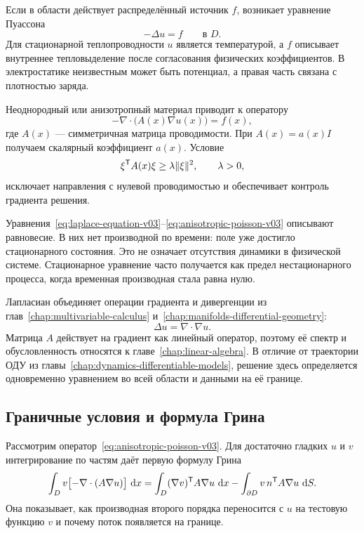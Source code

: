 Если в области действует распределённый источник $f$, возникает уравнение Пуассона
\begin{equation}
\label{eq:poisson-equation-v03}
-\Delta u=f
\qquad
\text{в }D.
\end{equation}
Для стационарной теплопроводности $u$ является температурой, а $f$ описывает внутреннее тепловыделение после согласования физических коэффициентов. В электростатике неизвестным может быть потенциал, а правая часть связана с плотностью заряда.

Неоднородный или анизотропный материал приводит к оператору
\begin{equation}
\label{eq:anisotropic-poisson-v03}
-\nabla\cdot\bigl(A(x)\nabla u(x)\bigr)=f(x),
\end{equation}
где $A(x)$ --- симметричная матрица проводимости. При $A(x)=a(x)I$ получаем скалярный коэффициент $a(x)$. Условие
\begin{equation}
\label{eq:anisotropic-ellipticity-v03}
\xi^{\mathsf{T}}A(x)\xi
\geq
\lambda\lVert\xi\rVert^{2},
\qquad
\lambda>0,
\end{equation}
исключает направления с нулевой проводимостью и обеспечивает контроль градиента решения.

Уравнения~\eqref{eq:laplace-equation-v03}--\eqref{eq:anisotropic-poisson-v03} описывают равновесие. В них нет производной по времени: поле уже достигло стационарного состояния. Это не означает отсутствия динамики в физической системе. Стационарное уравнение часто получается как предел нестационарного процесса, когда временная производная стала равна нулю.

\begin{connection}
Лапласиан объединяет операции градиента и дивергенции из глав~\ref{chap:multivariable-calculus} и~\ref{chap:manifolds-differential-geometry}:
\[
\Delta u=\nabla\cdot\nabla u.
\]
Матрица $A$ действует на градиент как линейный оператор, поэтому её спектр и обусловленность относятся к главе~\ref{chap:linear-algebra}. В отличие от траектории ОДУ из главы~\ref{chap:dynamics-differentiable-models}, решение здесь определяется одновременно уравнением во всей области и данными на её границе.
\end{connection}

\subsection{Граничные условия и формула Грина}

Рассмотрим оператор~\eqref{eq:anisotropic-poisson-v03}. Для достаточно гладких $u$ и $v$ интегрирование по частям даёт первую формулу Грина
\begin{equation}
\label{eq:green-identity-anisotropic-v03}
\int_D
v\bigl[-\nabla\cdot(A\nabla u)\bigr] \,\mathop{}\!\mathrm{d} x
=
\int_D
(\nabla v)^{\mathsf{T}}A\nabla u\,\mathop{}\!\mathrm{d} x
-
\int_{\partial D}
v\,n^{\mathsf{T}}A\nabla u\,\mathop{}\!\mathrm{d} S.
\end{equation}
Она показывает, как производная второго порядка переносится с $u$ на тестовую функцию $v$ и почему поток появляется на границе.

